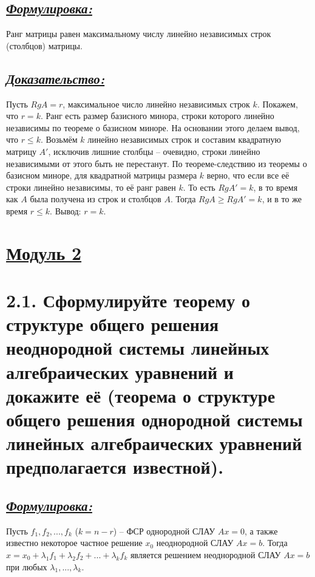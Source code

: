 \documentclass{article}
\begin{document}
\subsection*{\Large \underline{\textit{Формулировка: }}}
Ранг матрицы равен максимальному числу линейно независимых строк (столбцов) матрицы.

\subsection*{\Large \underline{\textit{Доказательство: }}}
Пусть $RgA = r$, максимальное число линейно независимых строк $k$. Покажем, что $r = k$.
\newline Ранг есть размер базисного минора, строки которого линейно независимы по теореме о базисном миноре. На основании этого делаем вывод, что $r \le k$. Возьмём $k$ линейно независимых строк и составим квадратную матрицу $A'$, исключив лишние столбцы -- очевидно, строки линейно независимыми от этого быть не перестанут. По теореме-следствию из теоремы о базисном миноре, для квадратной матрицы размера $k$ верно, что если все её строки линейно независимы, то её ранг равен $k$. То есть $RgA' = k$, в то время как $A$ была получена из строк и столбцов $A$. Тогда $RgA \ge RgA' = k$, и в то же время $r \le k$. Вывод: $r = k$.

\newpage
{}
\section*{\LARGE\centering \underline{Модуль 2}}

\section*{\LARGE 2.1. Сформулируйте теорему о структуре общего решения неоднородной системы линейных алгебраических уравнений и докажите её (теорема о структуре общего решения однородной системы линейных алгебраических уравнений предполагается известной).}
\subsection*{\Large \underline{\textit{Формулировка: }}}
Пусть $f_1, f_2, ..., f_k$ ($k = n - r$) -- ФСР однородной СЛАУ $Ax = 0$, а также известно некоторое частное решение $x_0$ неоднородной СЛАУ $Ax = b$. Тогда $x = x_0 + \lambda_1f_1 + \lambda_2f_2 + ... + \lambda_kf_k$ является решением неоднородной СЛАУ $Ax = b$ при любых $\lambda_1, ..., \lambda_k$.
\end{document}
